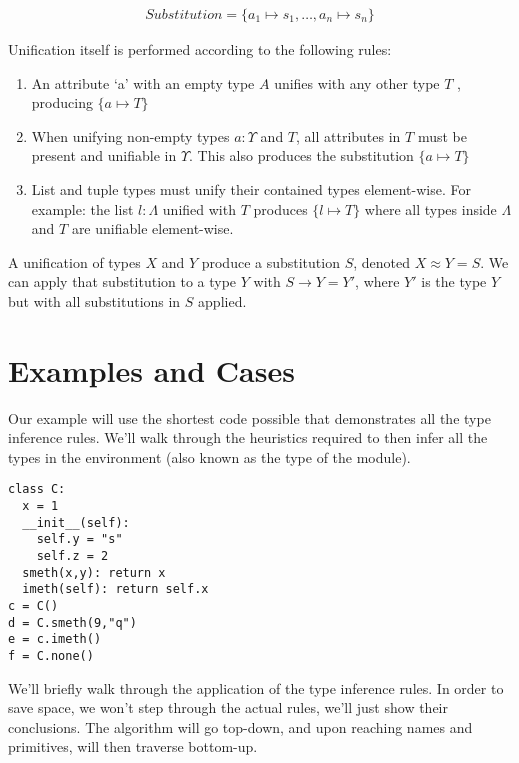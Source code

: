 \documentclass{article}
\begin{document}
\begin{align*}
Substitution = \{a_1 \mapsto s_1, \dots, a_n \mapsto s_n\}
\end{align*}

Unification itself is performed according to the following rules:

\begin{enumerate}
\item An attribute `a' with an empty type $A$ unifies with any other type $T$ , producing $\{a \mapsto T\}$ 
\item When unifying non-empty types $a : \Upsilon$ and $T$, all attributes in $T$ must be
present and unifiable in $\Upsilon$. This also produces the substitution $\{a \mapsto T\}$
\item List and tuple types must unify their contained types element-wise. For example: the list $l : \Lambda$ unified with $T$ produces $\{l \mapsto T\}$ where all types inside $\Lambda$ and $T$ are unifiable element-wise.
\end{enumerate}

A unification of types $X$ and $Y$ produce a substitution $S$, denoted $X
\approx Y = S$. We can apply that substitution to a type $Y$ with $S
\rightarrow Y = Y'$, where $Y'$ is the type $Y$ but with all substitutions in
$S$ applied.

\section*{Examples and Cases}

Our example will use the shortest code possible that demonstrates all the type inference rules. We'll walk through the heuristics required to then infer all the types in the environment (also known as the type of the module).

\begin{minipage}{\linewidth}
\begin{verbatim}
class C:
  x = 1
  __init__(self):
    self.y = "s"
    self.z = 2
  smeth(x,y): return x
  imeth(self): return self.x
c = C()
d = C.smeth(9,"q")
e = c.imeth()
f = C.none()
\end{verbatim}
\end{minipage}

We'll briefly walk through the application of the type inference rules. In
order to save space, we won't step through the actual rules, we'll just show
their conclusions.  The algorithm will go top-down, and upon reaching names and
primitives, will then traverse bottom-up.
\end{document}
